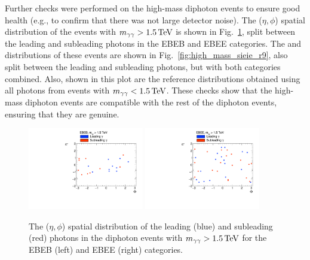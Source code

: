 Further checks were performed on the high-mass diphoton events to ensure good health (e.g., to confirm that there was not large detector noise). The ($\eta,\phi$) spatial distribution of the events with $m_{\gamma\gamma}>1.5\,\text{Te\hspace{-.08em}V}$ is shown in Fig.~\ref{fig:high_mass_eta_phi}, split between the leading and subleading photons in the EBEB and EBEE categories.  The \rnine and \sieie distributions of these events are shown in Fig.~\ref{fig:high_mass_sieie_r9}, also split between the leading and subleading photons, but with both categories combined. Also, shown in this plot are the reference distributions obtained using all photons from events with $m_{\gamma\gamma} < 1.5\,\text{Te\hspace{-.08em}V}$. These checks show that the high-mass diphoton events are compatible with the rest of the diphoton events, ensuring that they are genuine.

\begin{figure}[!hbt]
  \centering
  \includegraphics[width=0.45\textwidth]{figures/eta_phi_map_EBEB.pdf}
  \includegraphics[width=0.45\textwidth]{figures/eta_phi_map_EBEE.pdf}
  \caption{The ($\eta,\phi$) spatial distribution of the leading (blue) and subleading (red) photons in the diphoton events with $m_{\gamma\gamma}>1.5\,\text{Te\hspace{-.08em}V}$ for the EBEB (left) and EBEE (right) categories.}
  \label{fig:high_mass_eta_phi}
\end{figure}

